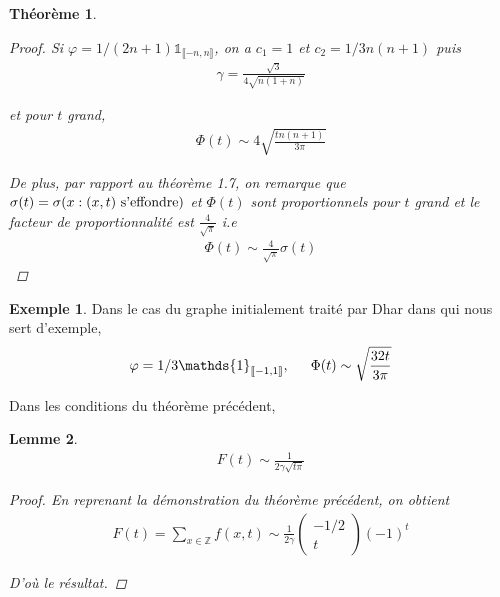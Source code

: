 \documentclass{article}
\newtheorem{theorem}{Théorème}[section]
\newtheorem{lemma}[theorem]{Lemme}
\theoremstyle{definition}
\newtheorem{exmp}{Exemple}[section]
\begin{document}
\begin{theorem}
\begin{proof}
Si $\varphi=1/(2n+1)\mathds{1}_{\llbracket-n,n\rrbracket}$, on a $c_1=1$ et $c_2=1/3 n(n+1)$ puis 
\begin{align*}
	\gamma=\frac{\sqrt{3}}{4\sqrt{n(1+n)}}
\end{align*}

et pour $t$ grand, 
\begin{align*}
	\Phi(t) \sim 4\sqrt{\frac{tn(n+1)}{3\pi}}
\end{align*} 

De plus, par rapport au théorème 1.7, on remarque que $\sigma(t) = \sigma(x : (x,t) \textup{ s'effondre})$ et $\Phi(t)$ sont proportionnels pour $t$ grand et le facteur de proportionnalité est $\frac{4}{\sqrt{\pi}}$ i.e \begin{align*}
			\Phi(t) \sim \frac{4}{\sqrt{\pi}} \sigma(t)\end{align*}
		\end{proof}\end{theorem}
		\begin{exmp}
			Dans le cas du graphe initialement traité par Dhar dans \cite{DHARBIS} qui nous sert d'exemple,
			\begin{align*}
			\varphi = 1/3\mathds{1}_{\llbracket -1, 1\rrbracket}, \indent \Phi(t) \sim \sqrt{\frac{32 t}{3\pi}}\end{align*}
		\end{exmp}
Dans les conditions du théorème précédent,
		\begin{lemma}
			\begin{align*}
			F(t) \sim \frac{1}{2\gamma \sqrt{t \pi}}\end{align*}
		\begin{proof}
		En reprenant la démonstration du théorème précédent, on obtient \begin{align*}
			F(t) = \sum_{x\in\mathbb{Z}}f(x,t) \sim \frac{1}{2\gamma}\begin{pmatrix}-1/2\\t\end{pmatrix}(-1)^t
		\end{align*}

		D'où le résultat.
	\end{proof}
\end{lemma}
\end{document}
